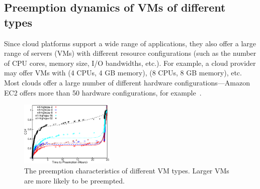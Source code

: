 




\subsection{Preemption dynamics of VMs of different types}
\label{subsec:types-dynamics}
Since cloud platforms support a wide range of applications, they also offer a large range of servers (VMs) with different resource configurations (such as the number of CPU cores, memory size, I/O bandwidths, etc.). 
For example, a cloud provider may offer VMs with (4 CPUs, 4 GB memory), (8 CPUs, 8 GB memory), etc.
Most clouds offer a large number of different hardware configurations---Amazon EC2 offers more than 50 hardware configurations, for example~\cite{amazon-ec2-instance-types}.

\begin{figure}
  \centering 
  \includegraphics[width=0.4\textwidth]{../graphs/scispot-fig-vm-types.eps}
  \caption{The preemption characteristics of different VM types. Larger VMs are more likely to be preempted.}
  \label{fig:cdf-comparison}
\end{figure}

